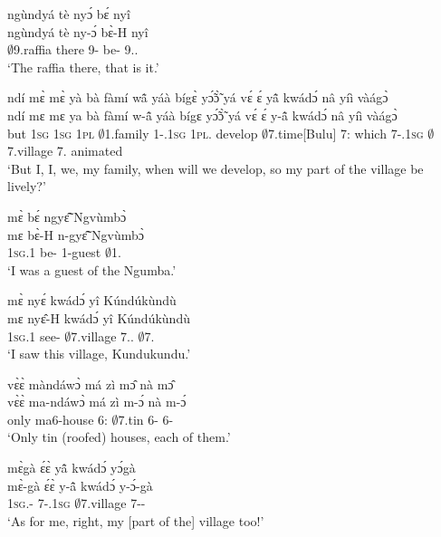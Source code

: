 \begin{exe}[(C234)]
\exC\label{40}
  \glll   ngùndyá tè nyɔ́ bɛ́ nyî \\
          ngùndyá tè ny-ɔ́ bɛ̀-H nyî \\
           $\emptyset$9.raffia there 9-{\OBJ} be-{\R} 9.{\DEM}.{\PROX}  \\
    \trans `The raffia there, that is it.'
 
\exC\label{41}
  \glll   ndí mɛ̀ mɛ̀ yà bà fàmí wã̂ yáà bígɛ̀ yɔ̃́ɔ̃̀ yá vɛ́ ɛ́ yã̂ kwádɔ́ nâ yíì vàágɔ̀ \\
         ndí mɛ mɛ ya bà fàmí w-ã̂ yáà bígɛ yɔ̃́ɔ̃̀ yá vɛ́ ɛ́ y-ã̂ kwádɔ́ nâ yíì vàágɔ̀ \\
            but 1\textsc{sg} 1\textsc{sg} 1\textsc{pl} {\AP} $\emptyset$1.family 1-{\POSS}.1\textsc{sg} 1\textsc{pl}.{\FUT} develop $\emptyset$7.time[Bulu] 7:{\ATT}  which {\LOC} 7-{\POSS}.1\textsc{sg}  $\emptyset$7.village {\COMP} 7.{\COP} animated \\
    \trans `But I, I, we, my family, when will we develop, so my part of the village be lively?'
 
\exC\label{42}
  \glll   mɛ̀ bɛ́ ngyɛ̃̂ Ngvùmbɔ̀ \\
          mɛ bɛ̀-H n-gyɛ̃̂ Ngvùmbɔ̀ \\
           1\textsc{sg}.{\PST}1 be-{\R} {\N}1-guest $\emptyset$1.{\PN}  \\
    \trans `I was a guest of the Ngumba.'
 
\exC\label{43} 
  \glll  mɛ̀ nyɛ́ kwádɔ́ yî Kúndúkùndù \\
         mɛ nyɛ̂-H kwádɔ́ yî Kúndúkùndù \\
            1\textsc{sg}.{\PST}1 see-{\R} $\emptyset$7.village 7.{\DEM}.{\PROX} $\emptyset$7.{\PN} \\
    \trans `I saw this village, Kundukundu.'
 
\exC\label{44}
  \glll   vɛ̀ɛ̀ màndáwɔ̀ má zì mɔ̂ nà mɔ̂ \\
          vɛ̀ɛ̀ ma-ndáwɔ̀ má zì m-ɔ́ nà m-ɔ́ \\
           only ma6-house 6:{\ATT}  $\emptyset$7.tin 6-{\OBJ} {\COM} 6-{\OBJ}  \\
    \trans `Only tin (roofed) houses, each of them.'
 
\exC\label{45} 
  \glll   mɛ̀gà ɛ́ɛ̀ yã̂ kwádɔ́ yɔ́gà \\
          mɛ̀-gà ɛ́ɛ̀ y-ã̂ kwádɔ́ y-ɔ́-gà \\
            1\textsc{sg}.{\SBJ}-{\CONTR} {\EXCL} 7-{\POSS}.1\textsc{sg} $\emptyset$7.village 7-{\OBJ}-{\CONTR} \\
    \trans `As for me, right, my [part of the] village too!'
 

\end{exe}
